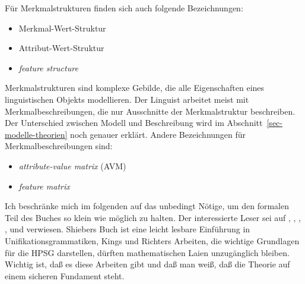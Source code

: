 




Für Merkmalstrukturen finden sich auch folgende Bezeichnungen: 
\begin{itemize}
\item Merkmal-Wert-Struktur
\item Attribut-Wert-Struktur
\item \emph{feature structure}
\end{itemize}
Merkmalstrukturen sind komplexe Gebilde, die alle Eigenschaften eines linguistischen
Objekts modellieren. Der Linguist arbeitet meist mit Merkmalbeschreibungen, die nur Ausschnitte der
Merkmalstruktur beschreiben. Der Unterschied zwischen Modell und Beschreibung wird im Abschnitt~\ref{sec-modelle-theorien}
noch genauer erklärt. Andere Bezeichnungen für Merkmalbeschreibungen sind:
\begin{itemize}
\item \emph{attribute-value matrix} (AVM)
\item \emph{feature matrix}
\end{itemize}
Ich beschränke mich im folgenden auf das unbedingt Nötige, um den formalen Teil
des Buches so klein wie möglich zu halten. Der interessierte Leser sei auf
\citet{Shieber86a}, \citet[Kapitel~2]{ps}, \citet{Johnson88}, \citet{Carpenter92a},
\citet{King94a} und \citet{Richter2004a-u} verwiesen. Shiebers Buch ist
eine leicht lesbare Einführung in Unifikationsgrammatiken, Kings und Richters Arbeiten, die wichtige Grundlagen
für die HPSG darstellen, dürften mathematischen Laien unzugänglich bleiben.
Wichtig ist, daß es diese Arbeiten gibt und daß man weiß, daß die Theorie
auf einem sicheren Fundament steht.

